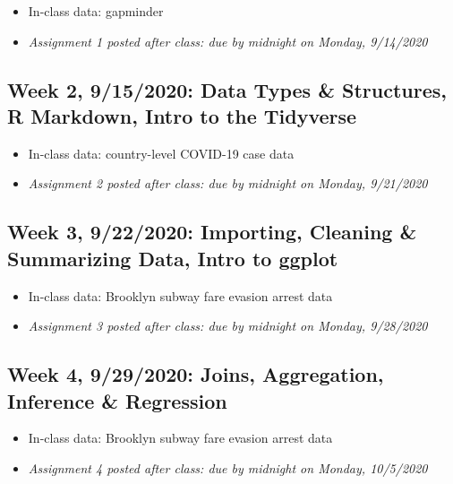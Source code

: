 \documentclass[11pt,]{article}
\providecommand{\tightlist}{%
  \setlength{\itemsep}{0pt}\setlength{\parskip}{0pt}}
\begin{document}
\begin{itemize}
\tightlist
\item
  In-class data: gapminder
\item
  \emph{Assignment 1 posted after class: due by midnight on Monday,
  9/14/2020} \medskip
\end{itemize}

\hypertarget{week-2-9152020-data-types-structures-r-markdown-intro-to-the-tidyverse}{%
\subsection{Week 2, 9/15/2020: Data Types \& Structures, R Markdown,
Intro to the
Tidyverse}\label{week-2-9152020-data-types-structures-r-markdown-intro-to-the-tidyverse}}

\begin{itemize}
\tightlist
\item
  In-class data: country-level COVID-19 case data
\item
  \emph{Assignment 2 posted after class: due by midnight on Monday,
  9/21/2020} \medskip
\end{itemize}

\hypertarget{week-3-9222020-importing-cleaning-summarizing-data-intro-to-ggplot}{%
\subsection{Week 3, 9/22/2020: Importing, Cleaning \& Summarizing Data,
Intro to
ggplot}\label{week-3-9222020-importing-cleaning-summarizing-data-intro-to-ggplot}}

\begin{itemize}
\tightlist
\item
  In-class data: Brooklyn subway fare evasion arrest data
\item
  \emph{Assignment 3 posted after class: due by midnight on Monday,
  9/28/2020} \medskip
\end{itemize}

\hypertarget{week-4-9292020-joins-aggregation-inference-regression}{%
\subsection{Week 4, 9/29/2020: Joins, Aggregation, Inference \&
Regression}\label{week-4-9292020-joins-aggregation-inference-regression}}

\begin{itemize}
\tightlist
\item
  In-class data: Brooklyn subway fare evasion arrest data
\item
  \emph{Assignment 4 posted after class: due by midnight on Monday,
  10/5/2020} \medskip
\end{itemize}
\end{document}
